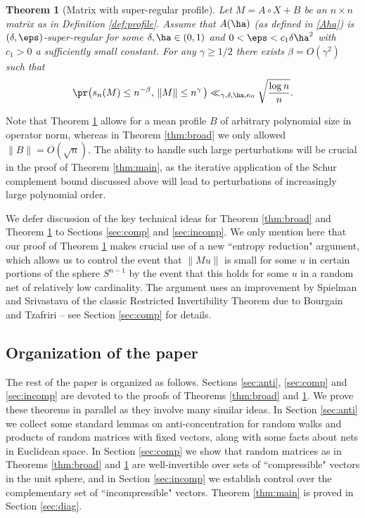 \documentclass[aop,preprint]{imsart}
\theoremstyle{plain}
\newtheorem{theorem}{Theorem}[section]
\theoremstyle{definition}
\theoremstyle{remark}
\numberwithin{equation}{section}
\numberwithin{theorem}{section}
\begin{document}
\begin{theorem}[Matrix with super-regular profile]	\label{thm:super}
Let $M=A\circ X+B$ be an $n\times n$ matrix as in Definition \ref{def:profile}.
Assume that $A(\ha)$ (as defined in \eqref{Aha}) is $(\delta,\eps)$-super-regular for some $\delta,\ha\in (0,1)$ and $0<\eps<c_1\delta \ha^2$ with $c_1>0$ a sufficiently small constant.
For any $\gamma\ge1/2$ there exists $\beta = O(\gamma^2)$ such that
\begin{equation}	\label{bd:super}
\pr\big( s_n(M) \le n^{-\beta},\, \|M\|\le n^\gamma\,\big) \ll_{\gamma,\delta,\ha,\kappa_0} \sqrt{\frac{\log n}{n}}.
\end{equation}
\end{theorem}

Note that Theorem \ref{thm:super} allows for a mean profile $B$ of arbitrary polynomial size in operator norm, whereas in Theorem \ref{thm:broad} we only allowed $\|B\|=O(\sqrt{n})$. 
The ability to handle such large perturbations will be crucial in the proof of Theorem \ref{thm:main}, as the iterative application of the Schur complement bound discussed above will lead to perturbations of increasingly large polynomial order. 

We defer discussion of the key technical ideas for Theorem \ref{thm:broad} and Theorem \ref{thm:super} to Sections \ref{sec:comp} and \ref{sec:incomp}. 
We only mention here that our proof of Theorem \ref{thm:super} makes crucial use of a new ``entropy reduction" argument, which allows us to control the event that $\|Mu\|$ is small for some $u$ in certain portions of the sphere $S^{n-1}$ by the event that this holds for some $u$ in a random net of relatively low cardinality. 
The argument uses an improvement by Spielman and Srivastava \citep{SpSr:rit} of the classic Restricted Invertibility Theorem due to Bourgain and Tzafriri \citep{BoTz:rit} -- see Section \ref{sec:comp} for details.



\subsection{Organization of the paper}

The rest of the paper is organized as follows.
Sections \ref{sec:anti}, \ref{sec:comp} and \ref{sec:incomp} are devoted to the proofs of Theorems \ref{thm:broad} and \ref{thm:super}.
We prove these theorems in parallel as they involve many similar ideas.
In Section \ref{sec:anti} we collect some standard lemmas on anti-concentration for random walks and products of random matrices with fixed vectors, along with some facts about nets in Euclidean space.
In Section \ref{sec:comp} we show that random matrices as in Theorems \ref{thm:broad} and \ref{thm:super} are well-invertible over sets of ``compressible" vectors in the unit sphere, and in Section \ref{sec:incomp} we establish control over the complementary set of ``incompressible" vectors.
Theorem \ref{thm:main} is proved in Section \ref{sec:diag}. 
\end{document}
